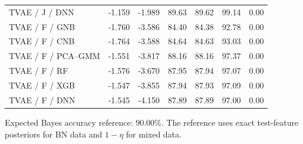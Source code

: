 \documentclass[11pt,letterpaper]{article}
\begin{document}
\begin{table}[H]
\begin{tabular}{lrrrrrr}
TVAE / J / DNN & -1.159 & -1.989 & 89.63 & 89.62 & 99.14 & 0.00\\
TVAE / F / GNB & -1.760 & -3.586 & 84.40 & 84.38 & 92.78 & 0.00\\
TVAE / F / CNB & -1.764 & -3.588 & 84.64 & 84.63 & 93.03 & 0.00\\
TVAE / F / PCA--GMM & -1.551 & -3.817 & 88.16 & 88.16 & 97.37 & 0.00\\
TVAE / F / RF & -1.576 & -3.670 & 87.95 & 87.94 & 97.07 & 0.00\\
TVAE / F / XGB & -1.547 & -3.855 & 87.94 & 87.93 & 97.09 & 0.00\\
TVAE / F / DNN & -1.545 & -4.150 & 87.89 & 87.89 & 97.00 & 0.00\\
\bottomrule\end{tabular}
\end{table}
Expected Bayes accuracy reference: 90.00\%. The reference uses exact test-feature posteriors for BN data and $1-\eta$ for mixed data.
\clearpage
\end{document}

